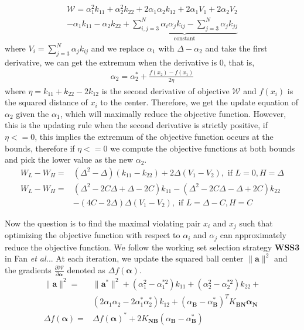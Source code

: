 \documentclass{llncs}
\newcommand{\etal}{\emph{et al.}}
\newcommand{\diff}[2]{\frac{\partial #1}{\partial #2}}
\newcommand{\vct}[1]{\ensuremath{\boldsymbol{#1}}} %
\begin{document}
\begin{eqnarray}
\mathcal{W} = \alpha_1^2k_{11}+\alpha_2^2k_{22}+2\alpha_1\alpha_2k_{12}+2\alpha_1V_1+2\alpha_2V_2\\ \nonumber - \alpha_1k_{11}-\alpha_2k_{22} + \underbrace{\sum_{i,j=3}^N\alpha_i\alpha_jk_{ij}-\sum_{j=3}^N\alpha_jk_{jj}}_{\text{constant}}
\end{eqnarray}
where $V_i = \sum_{j=3}^N\alpha_jk_{ij}$ and we replace $\alpha_1$ with $\Delta-\alpha_2$ and take the first derivative, we can get the extremum when the derivative is $0$, that is, 
\begin{eqnarray}
\alpha_2 = \alpha_2^* + \frac{f(x_2)-f(x_1)}{2\eta}
\end{eqnarray}
where $\eta=k_{11}+k_{22}-2k_{12}$ is the second derivative of objective $\mathcal{W}$ and $f(x_i)$ is the squared distance of $x_i$ to the center.  Therefore, we get the update equation of $\alpha_2$ given the $\alpha_1$, which will maximally reduce the objective function. However, this is the updating rule when the second derivative is strictly positive, if $\eta <=0$, this implies the extremum of the objective function occurs at the bounds, therefore if $\eta <=0$ we compute the objective functions at both bounds and pick the lower value as the new $\alpha_2$.
\begin{align}
W_L - W_H = & (\Delta^2-\Delta)(k_{11} - k_{22})+ 2\Delta(V_1-V_2),
\,\, \text{if } L=0, H=\Delta \\
W_L - W_H = & (\Delta^2-2C\Delta+\Delta-2C)k_{11} -  (\Delta^2-2C\Delta-\Delta+2C)k_{22} \\ \nonumber
& - (4C-2\Delta)\Delta(V_1-V_2),
\,\, \text{if } L=\Delta-C, H=C
\end{align}

Now the question is to find the maximal violating pair $x_i$ and $x_j$ such that optimizing the objective function with respect to $\alpha_i$ and $\alpha_j$ can approximately reduce the objective function. We follow the working set selection strategy \textbf{WSS3} in Fan \etal.\cite{fan05jmlr}. At each iteration, we update the squared ball center $\|\mathbf{a}\|^2$ and the gradients $\diff{\mathcal{W}}{\vct \alpha}$ denoted as $\varDelta f(\vct \alpha)$. 
\begin{align}
\|\mathbf{a}\|^2 =& 	\|\mathbf{a}^*\|^2 + (\alpha_1^2-\alpha_1^{*2})k_{11}+(\alpha_2^2-\alpha_2^{*2})k_{22}+ \\ \nonumber
&(2\alpha_1\alpha_2-2\alpha_1^*\alpha_2^*)k_{12}+ 
(\alpha_{\mathbf{B}} - \alpha^*_{\mathbf{B}})^TK_{\mathbf{BN}} \vct\alpha_{\mathbf{N}} \\
\varDelta f(\vct\alpha) = & \varDelta f(\vct\alpha)^* + 2K_{\mathbf{NB}}(\alpha_{\mathbf{B}} - \alpha^*_{\mathbf{B}})
\end{align}
\end{document}
